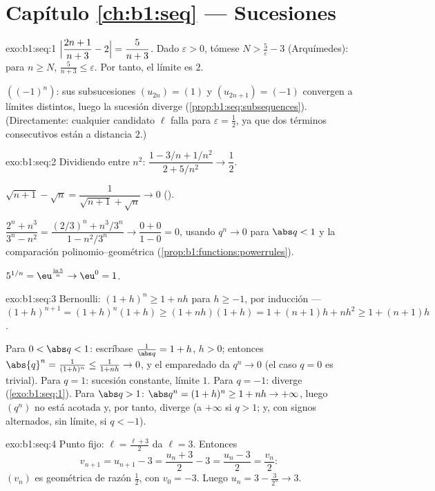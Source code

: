 \section*{Capítulo \ref{ch:b1:seq} --- Sucesiones}

\begin{solution}{exo:b1:seq:1}
$\Bigl|\dfrac{2n+1}{n+3} - 2\Bigr| = \dfrac{5}{n+3}$. Dado
$\varepsilon > 0$, tómese $N > \frac 5\varepsilon - 3$ (Arquímedes):
para $n \geq N$, $\frac{5}{n+3} \leq \varepsilon$. Por tanto, el
límite es $2$.

$((-1)^n)$: sus subsucesiones $(u_{2n}) = (1)$ y $(u_{2n+1}) = (-1)$
convergen a límites distintos, luego la sucesión diverge
(\cref{prop:b1:seq:subsequences}). (Directamente: cualquier candidato
$\ell$ falla para $\varepsilon = \frac12$, ya que dos términos
consecutivos están a distancia $2$.)
\end{solution}

\begin{solution}{exo:b1:seq:2}
Dividiendo entre $n^2$: $\dfrac{1 - 3/n + 1/n^2}{2 + 5/n^2} \to
\dfrac12$.

$\sqrt{n+1} - \sqrt n = \dfrac{1}{\sqrt{n+1} + \sqrt n} \to 0$
().

$\dfrac{2^n + n^3}{3^n - n^2} = \dfrac{(2/3)^n + n^3/3^n}{1 -
n^2/3^n} \to \dfrac{0 + 0}{1 - 0} = 0$, usando $q^n \to 0$ para
$\abs q < 1$ y la comparación polinomio--geométrica
(\cref{prop:b1:functions:powerrules}).

$5^{1/n} = \eu^{\frac{\ln 5}{n}} \to \eu^0 = 1$.
\end{solution}

\begin{solution}{exo:b1:seq:3}
Bernoulli: $(1+h)^n \geq 1 + nh$ para $h \geq -1$, por inducción ---
$(1+h)^{n+1} = (1+h)^n(1+h) \geq (1+nh)(1+h) = 1 + (n+1)h + nh^2
\geq 1 + (n+1)h$.

Para $0 < \abs q < 1$: escríbase $\frac{1}{\abs q} = 1 + h$, $h > 0$;
entonces $\abs{q}^n = \frac{1}{(1+h)^n} \leq \frac{1}{1 + nh} \to 0$,
y el emparedado da $q^n \to 0$ (el caso $q = 0$ es trivial). Para
$q = 1$: sucesión constante, límite $1$. Para $q = -1$: diverge
(\cref{exo:b1:seq:1}). Para $\abs q > 1$: $\abs q^n = (1 + h)^n \geq
1 + nh \to +\infty$, luego $(q^n)$ no está acotada y, por tanto,
diverge (a $+\infty$ si $q > 1$; y, con signos alternados, sin límite,
si $q < -1$).
\end{solution}

\begin{solution}{exo:b1:seq:4}
Punto fijo: $\ell = \frac{\ell + 3}{2}$ da $\ell = 3$. Entonces
\[
v_{n+1} = u_{n+1} - 3 = \frac{u_n + 3}{2} - 3 = \frac{u_n - 3}{2} =
\frac{v_n}{2}:
\]
$(v_n)$ es geométrica de razón $\frac12$, con $v_0 = -3$. Luego
$u_n = 3 - \frac{3}{2^n} \to 3$.
\end{solution}


